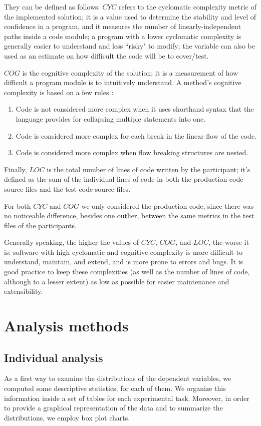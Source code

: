 They can be defined as follows:
\textbf{$CYC$} refers to the cyclomatic complexity metric of the implemented solution; it is a value used to determine the stability and level of confidence in a program, and it measures the number of linearly-independent paths inside a code module; a program with a lower cyclomatic complexity is generally easier to understand and less ``risky" to modify; the variable can also be used as an estimate on how difficult the code will be to cover/test.

\textbf{$COG$} is the cognitive complexity of the solution; it is a measurement of how difficult a program module is to intuitively understand. A method's cognitive complexity is based on a few rules \cite{CognitiveComplexity}:
\begin{enumerate}
    \item Code is not considered more complex when it uses shorthand syntax that the language provides for collapsing multiple statements into one.
    \item Code is considered more complex for each break in the linear flow of the code.
    \item Code is considered more complex when flow breaking structures are nested.
\end{enumerate}

Finally, $LOC$ is the total number of lines of code written by the participant; it's defined as the sum of the individual lines of code in both the production code source files and the test code source files.

For both $CYC$ and $COG$ we only considered the production code, since there was no noticeable difference, besides one outlier, between the same metrics in the test files of the participants.

Generally speaking, the higher the values of $CYC$, $COG$, and $LOC$, the worse it is: software with high cyclomatic and cognitive complexity is more difficult to understand, maintain, and extend, and is more prone to errors and bugs. It is good practice to keep these complexities (as well as the number of lines of code, although to a lesser extent) as low as possible for easier maintenance and extensibility.





\section{Analysis methods}
\subsection{Individual analysis}
As a first way to examine the distributions of the dependent variables, we computed some descriptive statistics, for each of them. We organize this information inside a set of tables for each experimental task. Moreover, in order to provide a graphical representation of the data and to summarize the distributions, we employ box plot charts.

